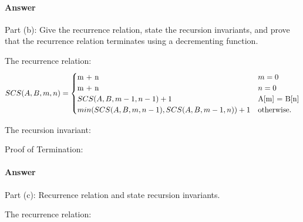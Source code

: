 \documentclass{article}
\begin{document}
\paragraph{Answer}{Part (b): Give the recurrence relation, state the recursion invariants, and prove that the recurrence relation terminates using a decrementing function.}

The recurrence relation: 
\begin{equation}
SCS(A, B, m, n) = 
\begin{cases}
   $m + n$ & \text{$m = 0$}\\
   $m + n$ & \text{$n = 0$}\\
    SCS(A, B, m-1, n-1) + 1 & \text{A[m] = B[n]}\\
    min(SCS(A, B, m, n - 1), SCS(A, B, m - 1, n))+ 1 & \text{otherwise}.
  \end{cases}
\end{equation}

The recursion invariant:

Proof of Termination:

\paragraph{Answer}{Part (c): Recurrence relation and state recursion invariants.}

The recurrence relation:
\end{document}
